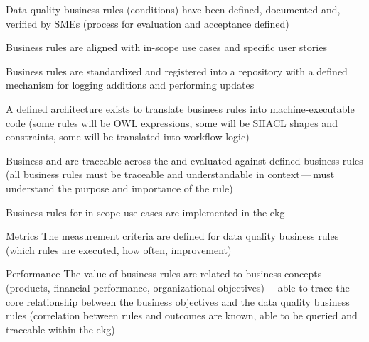 \kgmmscoringsection

\kgmmscoringlevelOne

\begin{scoring}

  \item Data quality business rules (conditions) have been defined, documented and, verified by SMEs (process for
        evaluation and acceptance defined)
  \item Business rules are aligned with in-scope use cases and specific user stories
  \item Business rules are standardized and registered into a repository with a defined mechanism for logging
        additions and performing updates

\end{scoring}

\kgmmscoringlevelTwo

\begin{scoring}

  \item A defined architecture exists to translate business rules into machine-executable code (some rules will be
        OWL expressions, some will be SHACL shapes and constraints, some will be translated into
        workflow logic)
  \item Business  and  are traceable across the  and
        evaluated against defined business rules (all business rules must be traceable and understandable in
        context\,---\,must understand the purpose and importance of the rule)
  \item Business rules for in-scope use cases are implemented in the \gls{ekg}

\end{scoring}

\kgmmscoringlevelThree

\begin{scoring}

    \item [Metrics] The measurement criteria are defined for data quality business rules (which rules are executed,
          how often, improvement)
    \item [Performance] The value of business rules are related to business concepts (products, financial performance,
          organizational objectives)\,---\,able to trace the core relationship between the business objectives and
          the data quality business rules (correlation between rules and outcomes are known, able to be queried and
          traceable within the \gls{ekg})

\end{scoring}

